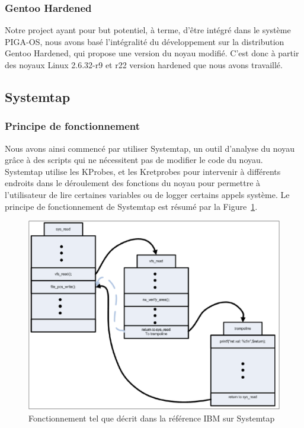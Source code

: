\documentclass[pdftex,a4paper,titlepage,11pt]{article}
\begin{document}
\subsubsection{Gentoo Hardened}

Notre project ayant pour but potentiel, à terme, d'être intégré dans le système PIGA-OS, nous avons basé l'intégralité du développement sur la distribution Gentoo Hardened, qui propose une version du noyau modifié. C'est donc à partir des noyaux Linux 2.6.32-r9 et r22 version hardened que nous avons travaillé.

\subsection{Systemtap}

\subsubsection{Principe de fonctionnement}

Nous avons ainsi commencé par utiliser Systemtap, un outil d'analyse du noyau grâce à des scripts qui ne nécessitent pas de modifier le code du noyau. Systemtap utilise les KProbes, et les Kretprobes\cite{IBMRBST} pour intervenir à différents endroits dans le déroulement des fonctions du noyau pour permettre à l'utilisateur de lire certaines variables ou de logger certains appels système. Le principe de fonctionnement de Systemtap est résumé par la Figure~\ref{IBMST}.

\begin{figure}[!ht]
	\centering
	\includegraphics[scale=0.4]{attachements/kretprob.png}
	\caption{Fonctionnement tel que décrit dans la référence IBM sur Systemtap \cite{IBMRBST}}
	\label{IBMST}
\end{figure}
\end{document}

